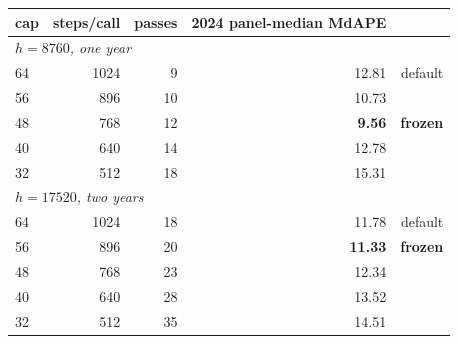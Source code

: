 \begin{tabular}{lrrrr}
\toprule
cap & steps/call & passes & 2024 panel-median MdAPE & \\
\midrule
\multicolumn{5}{l}{\emph{$h=8760$, one year}} \\
64 & 1024 & 9 & 12.81 & default \\
56 & 896 & 10 & 10.73 & \\
48 & 768 & 12 & \textbf{9.56} & \textbf{frozen} \\
40 & 640 & 14 & 12.78 & \\
32 & 512 & 18 & 15.31 & \\
\midrule
\multicolumn{5}{l}{\emph{$h=17520$, two years}} \\
64 & 1024 & 18 & 11.78 & default \\
56 & 896 & 20 & \textbf{11.33} & \textbf{frozen} \\
48 & 768 & 23 & 12.34 & \\
40 & 640 & 28 & 13.52 & \\
32 & 512 & 35 & 14.51 & \\
\bottomrule
\end{tabular}
